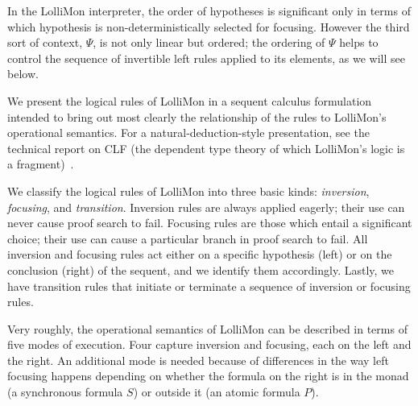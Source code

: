 \documentclass{sig-alt}
\begin{document}
In the
LolliMon interpreter, the order of hypotheses is significant only in
terms of which hypothesis is non-deterministically selected for
focusing.  However the third sort of context, $\Psi$, is not only linear but
ordered; the ordering of $\Psi$ helps to control the sequence of
invertible left rules applied to its elements, as we will see below.

\def\CLFRIseq#1#2#3{#1;#2\Rightarrow#3}
\def\CLFLFseq#1#2#3#4{#1;#2;#3\mathrel{>\!\! >}#4}
\def\CLFLseq#1#2#3{#1;#2\rightarrow#3}
\def\CLFLLFseq#1#2#3#4{#1;#2;#3\mathrel>#4}
\def\CLFLIseq#1#2#3#4{#1;#2;#3\rightarrow#4}
\def\CLFRFseq#1#2#3{#1;#2\mathrel{>\!\! >}#3}

We present the logical rules of LolliMon in a sequent calculus
formulation intended to bring out most clearly the relationship of the
rules to LolliMon's operational semantics.  For a
natural-deduction-style presentation, see the technical report on
CLF (the dependent type theory of which LolliMon's
logic is a fragment)~\cite{Watkins02tr}.  

We classify the logical rules of LolliMon into three basic kinds: {\it
inversion}, {\it focusing}, and {\it transition}.  Inversion rules are
always applied eagerly; their use can never cause proof search to fail.
Focusing rules are those which entail a significant choice; their use
can cause a particular branch in proof search to fail.  All inversion
and focusing rules act either on a specific hypothesis (left) or on the
conclusion (right) of the sequent, and we identify them accordingly.
Lastly, we have transition rules that initiate or terminate a sequence
of inversion or focusing rules.

Very roughly, the operational semantics of LolliMon can be described
in terms of five modes of execution.
Four capture inversion and focusing, each on the left and the right.
An additional mode is needed because of differences in the way
left focusing happens depending on whether the formula on the right
is in the monad (a synchronous formula $S$) or outside it (an atomic
formula $P$).
\end{document}
